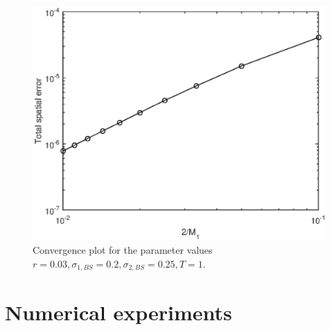\documentclass[10pt]{article}
\begin{document}
\begin{figure}
\begin{center}
\includegraphics[scale=0.5]{Convergence2DBS.eps}  
\caption{Convergence plot for the parameter values $r = 0.03, \sigma_{1,BS} = 0.2, \sigma_{2,BS}=0.25, T=1$.}
\label{fig:Convergence2DBS}
\end{center}
\end{figure}










 




\setcounter{equation}{0}
\section{Numerical experiments}\label{Experiments}






\setcounter{equation}{0}
\end{document}
